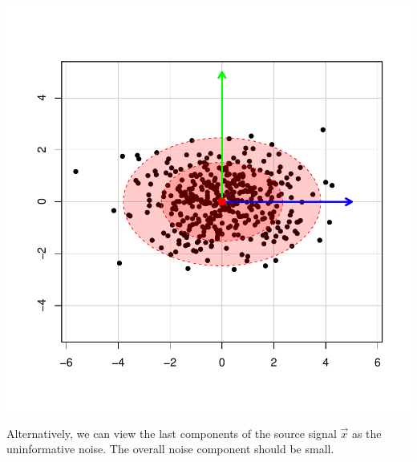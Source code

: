\documentclass[landscape,footrule]{foils}
\newcommand{\lastline}{\vspace*{-2ex}}
\begin{document}
\begin{center}
\includegraphics[scale=0.45]{rotated-distribution-ii.pdf}
\end{center}\vspace*{-1cm}

Alternatively, we can view the last components of the source signal $\vec{x}$ as the uninformative noise. The overall noise component should be small.\lastline

\end{document}

